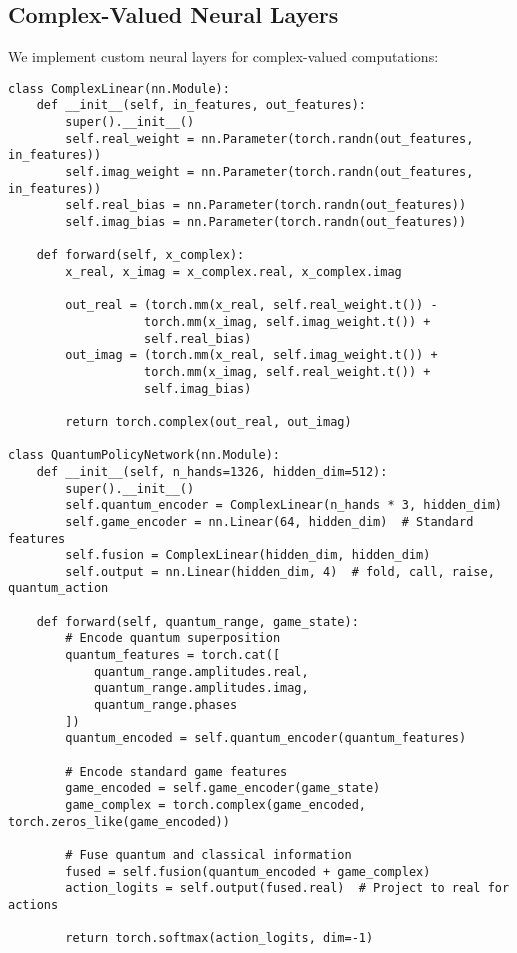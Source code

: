 \documentclass[11pt,a4paper]{article}
\begin{document}
\subsection{Complex-Valued Neural Layers}

We implement custom neural layers for complex-valued computations:

\begin{lstlisting}
class ComplexLinear(nn.Module):
    def __init__(self, in_features, out_features):
        super().__init__()
        self.real_weight = nn.Parameter(torch.randn(out_features, in_features))
        self.imag_weight = nn.Parameter(torch.randn(out_features, in_features))
        self.real_bias = nn.Parameter(torch.randn(out_features))
        self.imag_bias = nn.Parameter(torch.randn(out_features))
        
    def forward(self, x_complex):
        x_real, x_imag = x_complex.real, x_complex.imag
        
        out_real = (torch.mm(x_real, self.real_weight.t()) - 
                   torch.mm(x_imag, self.imag_weight.t()) + 
                   self.real_bias)
        out_imag = (torch.mm(x_real, self.imag_weight.t()) + 
                   torch.mm(x_imag, self.real_weight.t()) + 
                   self.imag_bias)
                   
        return torch.complex(out_real, out_imag)

class QuantumPolicyNetwork(nn.Module):
    def __init__(self, n_hands=1326, hidden_dim=512):
        super().__init__()
        self.quantum_encoder = ComplexLinear(n_hands * 3, hidden_dim)
        self.game_encoder = nn.Linear(64, hidden_dim)  # Standard features
        self.fusion = ComplexLinear(hidden_dim, hidden_dim)
        self.output = nn.Linear(hidden_dim, 4)  # fold, call, raise, quantum_action
        
    def forward(self, quantum_range, game_state):
        # Encode quantum superposition
        quantum_features = torch.cat([
            quantum_range.amplitudes.real,
            quantum_range.amplitudes.imag, 
            quantum_range.phases
        ])
        quantum_encoded = self.quantum_encoder(quantum_features)
        
        # Encode standard game features
        game_encoded = self.game_encoder(game_state)
        game_complex = torch.complex(game_encoded, torch.zeros_like(game_encoded))
        
        # Fuse quantum and classical information
        fused = self.fusion(quantum_encoded + game_complex)
        action_logits = self.output(fused.real)  # Project to real for actions
        
        return torch.softmax(action_logits, dim=-1)
\end{lstlisting}
\end{document}
